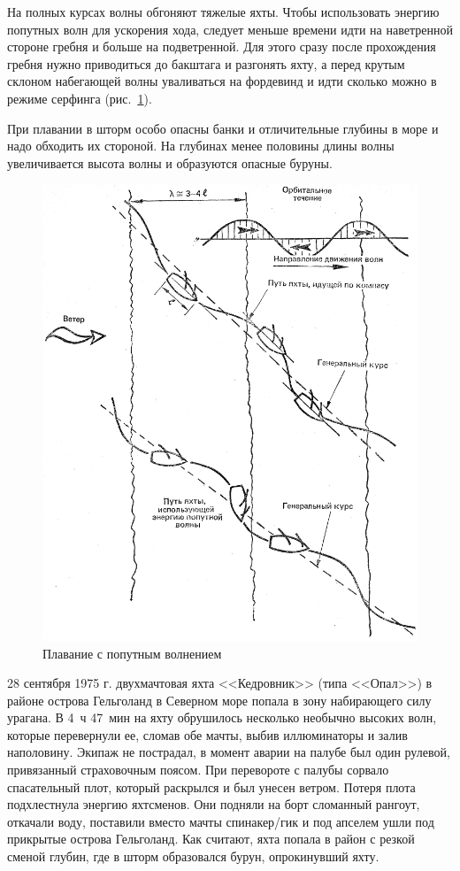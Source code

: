 \documentclass[a4paper, 12pt, twoside, final, book, russian, fittopage, cyremdash]{ncc}
\newcommand{\ris}[1]{\ref{fig:#1}}
\begin{document}
На полных курсах волны обгоняют тяжелые яхты. Чтобы использовать энергию попутных волн для ускорения хода, следует меньше времени идти на наветренной стороне гребня и больше на подветренной. Для этого сразу после прохождения гребня нужно приводиться до бакштага и разгонять яхту, а перед крутым склоном набегающей волны уваливаться на фордевинд и идти сколько можно в режиме серфинга (рис.~\ris{129}).

При плавании в шторм особо опасны банки и отличительные глубины в море и надо обходить их стороной. На глубинах менее половины длины волны увеличивается высота волны и образуются опасные буруны.

\begin{figure}[htb]
  \centering{}
  \includegraphics[scale=1.3]{0129P}
  \caption{Плавание с попутным волнением}
  \label{fig:129}
\end{figure}

{\small 28 сентября 1975 г. двухмачтовая яхта <<Кедровник>> (типа <<Опал>>) в районе острова Гельголанд в Северном море попала в зону набирающего силу урагана. В 4~ч 47~мин на яхту обрушилось несколько необычно высоких волн, которые перевернули ее, сломав обе мачты, выбив иллюминаторы и залив наполовину. Экипаж не пострадал, в момент аварии на палубе был один рулевой, привязанный страховочным поясом. При перевороте с палубы сорвало спасательный плот, который раскрылся и был унесен ветром. Потеря плота подхлестнула энергию яхтсменов. Они подняли на борт сломанный рангоут, откачали воду, поставили вместо мачты спинакер\-/гик и под апселем ушли под прикрытые острова Гельголанд. Как считают, яхта попала в район с резкой сменой глубин, где в шторм образовался бурун, опрокинувший яхту.}
\end{document}
